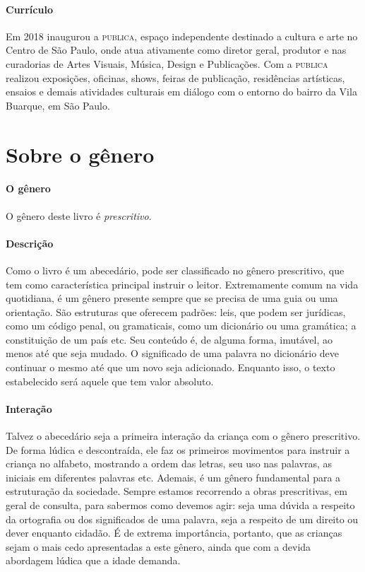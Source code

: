\documentclass[11pt]{extarticle}
\begin{document}
\paragraph{Currículo} Em 2018 inaugurou a \textsc{publica}, espaço independente destinado a cultura e arte no Centro de São Paulo, onde atua ativamente como diretor geral, produtor e nas curadorias de Artes Visuais, Música, Design e Publicações. Com a \textsc{publica} realizou exposições, oficinas, shows, feiras de publicação, residências artísticas, ensaios e demais atividades culturais em diálogo com o entorno do bairro da Vila Buarque, em São Paulo.
 


\section{Sobre o gênero}

\paragraph{O gênero} O gênero deste livro é \textit{prescritivo}. 


\paragraph{Descrição} Como o livro é um abecedário, pode ser classificado no gênero prescritivo, que tem como característica principal instruir o leitor.
Extremamente comum na vida quotidiana, é um gênero presente
sempre que se precisa de uma guia ou uma orientação. São estruturas 
que oferecem padrões: leis, que podem ser jurídicas, como um código
penal, ou gramaticais, como um dicionário ou uma gramática; a constituição
de um país etc. Seu conteúdo é, de alguma forma, imutável, ao menos até que seja
mudado. O significado de uma palavra no dicionário deve continuar o mesmo
até que um novo seja adicionado. Enquanto isso, o texto
estabelecido será aquele que tem valor absoluto.

\paragraph{Interação} Talvez o abecedário seja a primeira interação da criança com o gênero prescritivo. De forma lúdica e descontraída, ele faz os primeiros movimentos para instruir a criança no alfabeto, mostrando a ordem das letras, seu uso nas palavras, as iniciais em diferentes palavras etc. Ademais, é um gênero fundamental para a estruturação da sociedade.
Sempre estamos recorrendo a obras prescritivas, em geral de consulta, para
sabermos como devemos agir: seja uma dúvida a respeito da ortografia ou 
dos significados de uma palavra, seja a respeito de um direito ou dever
enquanto cidadão. É de extrema importância, portanto, que as crianças
sejam o mais cedo apresentadas a este gênero, ainda que com a 
devida abordagem lúdica que a idade demanda.
\end{document}
